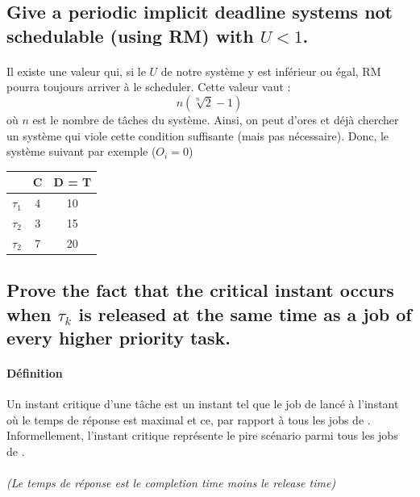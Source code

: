 \subsection{Give a periodic implicit deadline systems not schedulable (using RM) with \texorpdfstring{$U < 1$}{Lg}.} %
\paragraph{}
Il existe une valeur qui, si le $U$ de notre système y est inférieur ou égal, RM pourra toujours arriver à le scheduler. Cette valeur vaut : 
\begin{equation}
n(\sqrt[n\,]{2} - 1)
\end{equation} où $n$ est le nombre de tâches du système.
Ainsi, on peut d'ores et déjà chercher un système qui viole cette condition suffisante (mais pas nécessaire).
Donc, le système suivant par exemple ($O_{i} = 0$)
  \begin{center}
    \begin{tabular}{| l | c | c |}
      \hline
                   & C  & D = T  \\
      \hline
       $\tau_{1}$  & 4 & 10      \\
      \hline
       $\tau_{2}$  & 3 & 15      \\
      \hline       
      $\tau_{2}$   & 7 & 20      \\
      \hline
  \end{tabular}
  \end{center}




\subsection{Prove the fact that the critical instant occurs when \texorpdfstring{$\tau_{k}$}{Lg} is released at the same time as a job of every higher priority task.}

\paragraph{Définition} Un instant critique d'une tâche \ti est un instant tel que le job de \ti lancé à l'instant où le temps de réponse est maximal et ce, par rapport à tous les jobs de \ti. Informellement, l'instant critique représente le pire scénario parmi tous les jobs de \ti.

\paragraph{}\textit{(Le temps de réponse est le completion time moins le release time)}

